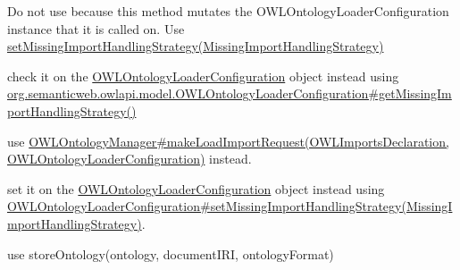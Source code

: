 \begin{DoxyRefList}
\item[\label{deprecated__deprecated000016}%
\hypertarget{deprecated__deprecated000016}{}%
Member \hyperlink{classorg_1_1semanticweb_1_1owlapi_1_1model_1_1_o_w_l_ontology_loader_configuration_ae1a3e84f9db3f193a781a4cd2154622b}{org.semanticweb.owlapi.model.O\-W\-L\-Ontology\-Loader\-Configuration.set\-Silent\-Missing\-Imports\-Handling} (boolean b)]Do not use because this method mutates the O\-W\-L\-Ontology\-Loader\-Configuration instance that it is called on. Use \hyperlink{}{set\-Missing\-Import\-Handling\-Strategy(\-Missing\-Import\-Handling\-Strategy)}  
\item[\label{deprecated__deprecated000020}%
\hypertarget{deprecated__deprecated000020}{}%
Member \hyperlink{interfaceorg_1_1semanticweb_1_1owlapi_1_1model_1_1_o_w_l_ontology_manager_a1733952624b146f3ecbe28a7590a2ca6}{org.semanticweb.owlapi.model.O\-W\-L\-Ontology\-Manager.is\-Silent\-Missing\-Imports\-Handling} ()]check it on the \hyperlink{}{O\-W\-L\-Ontology\-Loader\-Configuration} object instead using \hyperlink{classorg_1_1semanticweb_1_1owlapi_1_1model_1_1_o_w_l_ontology_loader_configuration_a7003306dae1fc02c52871a98acfa1379}{org.\-semanticweb.\-owlapi.\-model.\-O\-W\-L\-Ontology\-Loader\-Configuration\#get\-Missing\-Import\-Handling\-Strategy()}  
\item[\label{deprecated__deprecated000018}%
\hypertarget{deprecated__deprecated000018}{}%
Member \hyperlink{interfaceorg_1_1semanticweb_1_1owlapi_1_1model_1_1_o_w_l_ontology_manager_acdb310fe4c74378701a2635b50a8d233}{org.semanticweb.owlapi.model.O\-W\-L\-Ontology\-Manager.make\-Load\-Import\-Request} (O\-W\-L\-Imports\-Declaration declaration)]use \hyperlink{}{O\-W\-L\-Ontology\-Manager\#make\-Load\-Import\-Request(\-O\-W\-L\-Imports\-Declaration, O\-W\-L\-Ontology\-Loader\-Configuration)} instead.  
\item[\label{deprecated__deprecated000019}%
\hypertarget{deprecated__deprecated000019}{}%
Member \hyperlink{interfaceorg_1_1semanticweb_1_1owlapi_1_1model_1_1_o_w_l_ontology_manager_af82e4600a64d66ad291cb7edc01ccb7e}{org.semanticweb.owlapi.model.O\-W\-L\-Ontology\-Manager.set\-Silent\-Missing\-Imports\-Handling} (boolean b)]set it on the \hyperlink{}{O\-W\-L\-Ontology\-Loader\-Configuration} object instead using \hyperlink{}{O\-W\-L\-Ontology\-Loader\-Configuration\#set\-Missing\-Import\-Handling\-Strategy(\-Missing\-Import\-Handling\-Strategy)}.  
\item[\label{deprecated__deprecated000021}%
\hypertarget{deprecated__deprecated000021}{}%
Member \hyperlink{interfaceorg_1_1semanticweb_1_1owlapi_1_1model_1_1_o_w_l_ontology_storer_a792a5363908ebfc166263b16e7a30e6c}{org.semanticweb.owlapi.model.O\-W\-L\-Ontology\-Storer.store\-Ontology} (O\-W\-L\-Ontology\-Manager manager, O\-W\-L\-Ontology ontology, I\-R\-I document\-I\-R\-I, O\-W\-L\-Ontology\-Format ontology\-Format)]use store\-Ontology(ontology, document\-I\-R\-I, ontology\-Format)  

\end{DoxyRefList}
